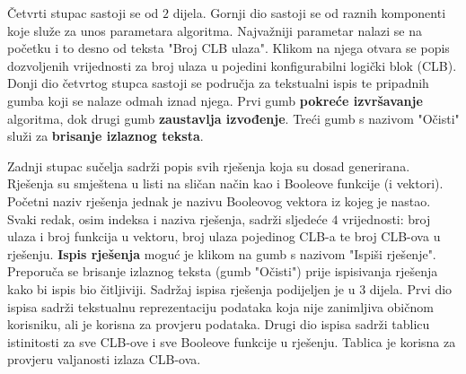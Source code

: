 \documentclass[times, utf8, diplomski]{fer}
\begin{document}
Četvrti stupac sastoji se od $2$ dijela. Gornji dio sastoji se od raznih komponenti koje služe za unos parametara algoritma. Najvažniji parametar nalazi se na početku i to desno od teksta "Broj CLB ulaza". Klikom na njega otvara se popis dozvoljenih vrijednosti za broj ulaza u pojedini konfigurabilni logički blok (CLB). Donji dio četvrtog stupca sastoji se područja za tekstualni ispis te pripadnih gumba koji se nalaze odmah iznad njega. Prvi gumb \textbf{pokreće izvršavanje} algoritma, dok drugi gumb \textbf{zaustavlja izvođenje}. Treći gumb s nazivom "Očisti" služi za \textbf{brisanje izlaznog teksta}. 

Zadnji stupac sučelja sadrži popis svih rješenja koja su dosad generirana. Rješenja su smještena u listi na sličan način kao i Booleove funkcije (i vektori). Početni naziv rješenja jednak je nazivu Booleovog vektora iz kojeg je nastao. Svaki redak, osim indeksa i naziva rješenja, sadrži sljedeće $4$ vrijednosti: broj ulaza i broj funkcija u vektoru, broj ulaza pojedinog CLB-a te broj CLB-ova u rješenju. \textbf{Ispis rješenja} moguć je klikom na gumb s nazivom "Ispiši rješenje". Preporuča se brisanje izlaznog teksta (gumb "Očisti") prije ispisivanja rješenja kako bi ispis bio čitljiviji. Sadržaj ispisa rješenja podijeljen je u $3$ dijela. Prvi dio ispisa sadrži tekstualnu reprezentaciju podataka koja nije zanimljiva običnom korisniku, ali je korisna za provjeru podataka. Drugi dio ispisa sadrži tablicu istinitosti za sve CLB-ove i sve Booleove funkcije u rješenju. Tablica je korisna za provjeru valjanosti izlaza CLB-ova.
\end{document}
